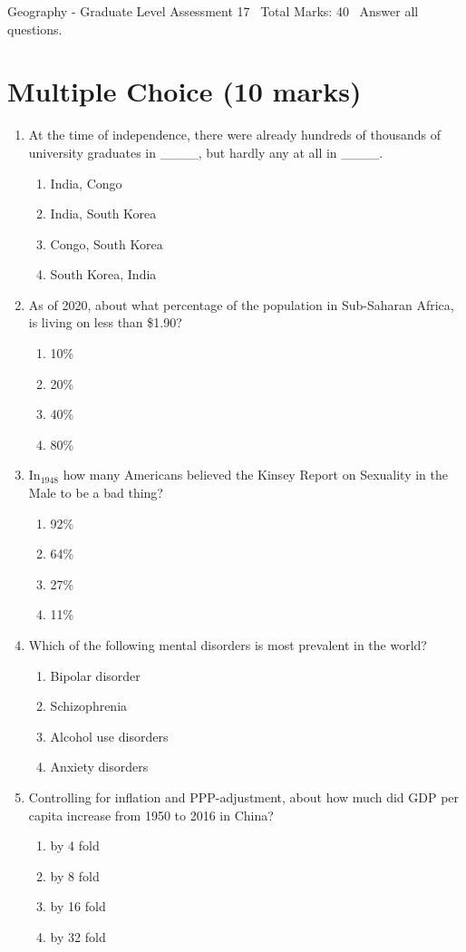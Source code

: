 \documentclass[12pt]{article}
\begin{document}
\begin{center}
Geography - Graduate Level Assessment 17 \
Total Marks: 40 \
Answer all questions.
\end{center}

\section*{Multiple Choice (10 marks)}
\begin{enumerate}[label=\arabic*.]
\item At the time of independence, there were already hundreds of thousands of university graduates in \_\_\_\_, but hardly any at all in \_\_\_\_.
\begin{enumerate}[label=(\alph*)]
    \item India, Congo
    \item India, South Korea
    \item Congo, South Korea
    \item South Korea, India
\end{enumerate}
\item As of 2020, about what percentage of the population in Sub-Saharan Africa, is living on less than \$1.90?
\begin{enumerate}[label=(\alph*)]
    \item 10\%
    \item 20\%
    \item 40\%
    \item 80\%
\end{enumerate}
\item In$_{1948}$ how many Americans believed the Kinsey Report on Sexuality in the Male to be a bad thing?
\begin{enumerate}[label=(\alph*)]
    \item 92\%
    \item 64\%
    \item 27\%
    \item 11\%
\end{enumerate}
\item Which of the following mental disorders is most prevalent in the world?
\begin{enumerate}[label=(\alph*)]
    \item Bipolar disorder
    \item Schizophrenia
    \item Alcohol use disorders
    \item Anxiety disorders
\end{enumerate}
\item Controlling for inflation and PPP-adjustment, about how much did GDP per capita increase from 1950 to 2016 in China?
\begin{enumerate}[label=(\alph*)]
    \item by 4 fold
    \item by 8 fold
    \item by 16 fold
    \item by 32 fold
\end{enumerate}
\end{enumerate}
\end{document}
